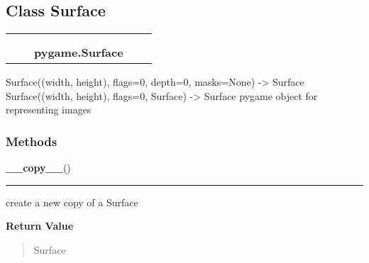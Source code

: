 

\subsection{Class Surface}

    \label{pygame:Surface}
\begin{tabular}{cccccc}
\multicolumn{2}{r}{\settowidth{\BCL}{object}\multirow{2}{\BCL}{object}}
&&
  \\\cline{3-3}
  &&\multicolumn{1}{c|}{}
&&
  \\
&&\multicolumn{2}{l}{\textbf{pygame.Surface}}
\end{tabular}

Surface((width, height), flags=0, depth=0, masks=None) -{\textgreater} 
Surface Surface((width, height), flags=0, Surface) -{\textgreater} Surface 
pygame object for representing images



  \subsubsection{Methods}

    \label{pygame:Surface:__copy__}

    \vspace{0.5ex}

\hspace{.8\funcindent}\begin{boxedminipage}{\funcwidth}

    \raggedright \textbf{\_\_copy\_\_}()

    \vspace{-1.5ex}

    \rule{\textwidth}{0.5\fboxrule}
\setlength{\parskip}{2ex}
    create a new copy of a Surface

\setlength{\parskip}{1ex}
      \textbf{Return Value}
    \vspace{-1ex}

      \begin{quote}
      Surface

      \end{quote}

    \end{boxedminipage}

